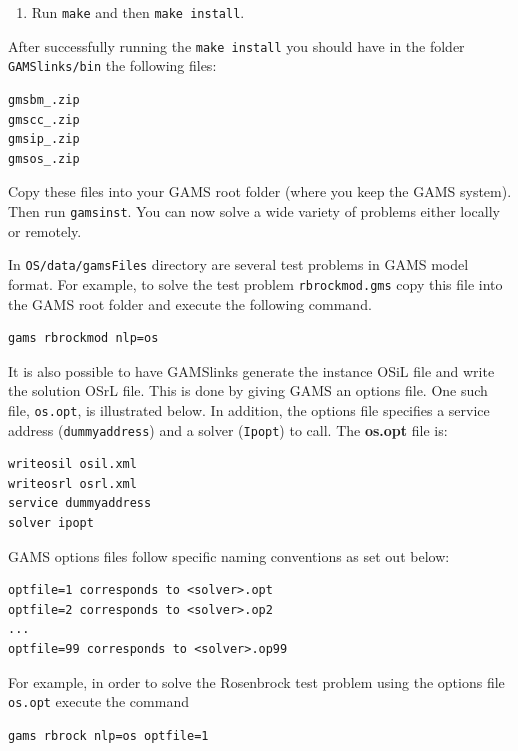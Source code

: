 \documentclass[11pt]{article}
\renewcommand{\_}{{\char"5F}}
\renewcommand{\{}{{\char"7B}}
\renewcommand{\}}{{\char"7D}}
\renewcommand{\^}{{\char"0D}}
\renewcommand{\'}{{\char"0D}}
\begin{document}
\begin{enumerate}[Step 1:]
\begin{enumerate}[1.]
\item Run {\tt make}  and then {\tt make install}.


\end{enumerate}

After successfully running the {\tt make install} you should have in the folder {\tt GAMSlinks/bin} the following files:
\begin{verbatim}
gmsbm_.zip
gmscc_.zip
gmsip_.zip
gmsos_.zip
\end{verbatim}

Copy these  files into your GAMS root folder (where you keep the GAMS system).  Then run {\tt gamsinst}.   You can now solve  a wide variety of  problems either locally or remotely.


In {\tt OS/data/gamsFiles} directory are several test problems in GAMS model format.
 For example, to solve the test problem {\tt rbrockmod.gms} copy this file into the GAMS root folder and execute the following command.

\begin{verbatim}
gams rbrockmod nlp=os
\end{verbatim}

It is also possible to have GAMSlinks generate the instance OSiL file and write the solution  OSrL file.
This is done by giving GAMS an options file. One such file, {\tt os.opt}, is illustrated below. In addition,
the options file specifies a service address ({\tt dummyaddress}) and a solver ({\tt Ipopt}) to call.
The {\bf os.opt} file is:

\begin{verbatim}
writeosil osil.xml
writeosrl osrl.xml
service dummyaddress
solver ipopt
\end{verbatim}

GAMS options files follow specific naming conventions as set out below:

\begin{verbatim}
optfile=1 corresponds to <solver>.opt
optfile=2 corresponds to <solver>.op2
...
optfile=99 corresponds to <solver>.op99
\end{verbatim}

For example, in order to solve the Rosenbrock test problem using the  options file  {\tt os.opt}
execute the command

\begin{verbatim}
gams rbrock nlp=os optfile=1
\end{verbatim}



\end{enumerate}
\end{document}
